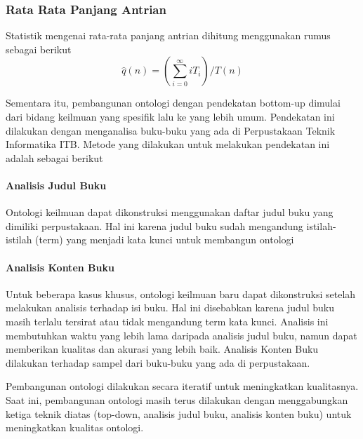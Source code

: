 \documentclass{article}
\begin{document}
\subsubsection{Rata Rata Panjang Antrian}
Statistik mengenai rata-rata panjang antrian dihitung menggunakan rumus sebagai berikut
$$\hat q (n) = (\sum_{i=0}^{\infty} iT_i) / T(n) $$





	
	Sementara itu, pembangunan ontologi dengan pendekatan bottom-up dimulai dari bidang keilmuan yang spesifik lalu ke yang lebih umum. Pendekatan ini dilakukan dengan menganalisa buku-buku yang ada di Perpustakaan Teknik Informatika ITB. Metode yang dilakukan untuk melakukan pendekatan ini adalah sebagai berikut
	\paragraph{Analisis Judul Buku}
 	Ontologi keilmuan dapat dikonstruksi menggunakan daftar judul buku yang dimiliki perpustakaan. Hal ini karena judul buku sudah mengandung istilah-istilah (term) yang menjadi kata kunci untuk membangun ontologi
 	\paragraph{Analisis Konten Buku}
 	Untuk beberapa kasus khusus, ontologi keilmuan baru dapat dikonstruksi setelah melakukan analisis terhadap isi buku. Hal ini disebabkan karena judul buku masih terlalu tersirat atau tidak mengandung term kata kunci. Analisis ini membutuhkan waktu yang lebih lama daripada analisis judul buku, namun dapat memberikan kualitas dan akurasi yang lebih baik. Analisis Konten Buku dilakukan terhadap sampel dari buku-buku yang ada di perpustakaan.

 	\vspace{5mm}
 	Pembangunan ontologi dilakukan secara iteratif untuk meningkatkan kualitasnya. Saat ini, pembangunan ontologi masih terus dilakukan dengan menggabungkan ketiga teknik diatas (top-down, analisis judul buku, analisis konten buku) untuk meningkatkan kualitas ontologi.
\end{document}
